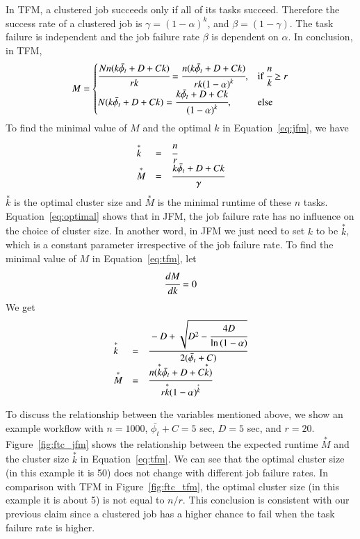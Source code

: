 In TFM, a clustered job succeeds only if all of its tasks succeed. Therefore the success rate of a clustered job is $\gamma = (1 - \alpha)^k$, and $\beta = (1 - \gamma)$. The task failure is independent and the job failure rate $\beta$ is dependent on $\alpha$. In conclusion, in TFM,
\begin{equation} 
\label{eq:tfm}
M=
\begin{cases}
\cfrac{Nn(k\bar{\phi_t}+D+Ck)}{rk}=\cfrac{n(k\bar{\phi_t}+D+Ck)}{rk{(1-\alpha)}^k}, & \text{if } \cfrac{n}{k}\geq r \\
N(k\bar{\phi_t}+D+Ck)=\cfrac{k\bar{\phi_t}+D+Ck}{{(1-\alpha)}^k}, & \text{else}
\end{cases}
\end{equation}
To find the minimal value of $M$ and the optimal $k$ in Equation~\ref{eq:jfm}, we have
\begin{equation} 
\label{eq:optimal}
\begin{array}{lcl}
\overset{*}{k} & = & \cfrac{n}{r} \\
\overset{*}{M} & = & \cfrac{k\bar{\phi_t}+D+Ck}{\gamma}
\end{array}
\end{equation}
$\overset{*}{k}$ is the optimal cluster size and $\overset{*}{M}$ is the minimal runtime of these $n$ tasks. Equation~\ref{eq:optimal} shows that in JFM, the job failure rate has no influence on the choice of cluster size. In another word, in JFM we just need to set $k$ to be $\overset{*}{k}$, which is a constant parameter irrespective of the job failure rate.
To find the minimal value of $M$ in Equation~\ref{eq:tfm}, let 
 \begin{equation} 
\cfrac{d{M}}{dk}=0
\end{equation}
We get 
\begin{equation} 
\label{eq:optimal1}
\begin{array}{lcl}

\overset{*}{k} & = & \cfrac{-D+\sqrt{D^2-\cfrac{4D}{\ln{(1-\alpha)}}}}{2(\bar{\phi_t}+C)}   \\
\overset{*}{M} & = & \cfrac{n(\overset{*}{k}\bar{\phi_t}+D+C\overset{*}{k})}{r{\overset{*}{k}}(1-\alpha)^{\overset{*}{k}}}
\end{array}
\end{equation}

To discuss the relationship between the variables mentioned above, we show an example workflow with $n=1000$, $\bar{\phi_t}+C=5$ sec, $D=5$ sec, and $r=20$. 
Figure~\ref{fig:ftc_jfm} shows the relationship between the expected runtime $\overset{*}{M}$ and the cluster size $\overset{*}{k}$ in Equation~\ref{eq:tfm}. We can see that the optimal cluster size (in this example it is 50) does not change with different job failure rates. In comparison with TFM in Figure~\ref{fig:ftc_tfm}, the optimal cluster size (in this example it is about 5) is not equal to $n/r$. This conclusion is consistent with our previous claim since a clustered job has a higher chance to fail when the task failure rate is higher.
 
